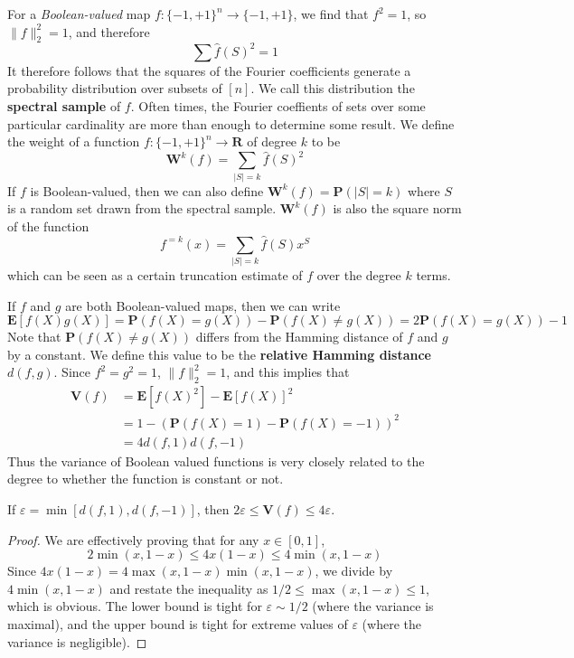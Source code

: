 For a {\it Boolean-valued} map $f: \{ -1, +1 \}^n \to \{ -1, +1 \}$, we find that $f^2 = 1$, so $\| f \|_2^2 = 1$, and therefore
%
\[ \sum \widehat{f}(S)^2 = 1 \]
%
It therefore follows that the squares of the Fourier coefficients generate a probability distribution over subsets of $[n]$. We call this distribution the {\bf spectral sample} of $f$. Often times, the Fourier coeffients of sets over some particular cardinality are more than enough to determine some result. We define the weight of a function $f: \{ -1, +1 \}^n \to \mathbf{R}$ of degree $k$ to be
%
\[ \mathbf{W}^k(f) = \sum_{|S| = k} \widehat{f}(S)^2 \]
%
If $f$ is Boolean-valued, then we can also define $\mathbf{W}^k(f) = \mathbf{P}(|S| = k)$ where $S$ is a random set drawn from the spectral sample. $\mathbf{W}^k(f)$ is also the square norm of the function
%
\[ f^{=k}(x) = \sum_{|S| = k} \widehat{f}(S) x^S \]
%
which can be seen as a certain truncation estimate of $f$ over the degree $k$ terms.

If $f$ and $g$ are both Boolean-valued maps, then we can write
%
\[ \mathbf{E}[f(X)g(X)] = \mathbf{P}(f(X) = g(X)) - \mathbf{P}(f(X) \neq g(X)) = 2\mathbf{P}(f(X) = g(X)) - 1 \]
%
Note that $\mathbf{P}(f(X) \neq g(X))$ differs from the Hamming distance of $f$ and $g$ by a constant. We define this value to be the {\bf relative Hamming distance} $d(f,g)$. Since $f^2 = g^2 = 1$, $\| f \|_2^2 = 1$, and this implies that
%
\begin{align*}
    \mathbf{V}(f) &= \mathbf{E}[f(X)^2] - \mathbf{E}[f(X)]^2\\
    &= 1 - (\mathbf{P}(f(X) = 1) - \mathbf{P}(f(X) = -1))^2\\
    &= 4d(f,1)d(f,-1)
\end{align*}
%
Thus the variance of Boolean valued functions is very closely related to the degree to whether the function is constant or not.

\begin{lemma}
    If $\varepsilon = \min[d(f,1),d(f,-1)]$, then $2\varepsilon \leq \mathbf{V}(f) \leq 4\varepsilon$.
\end{lemma}
\begin{proof}
    We are effectively proving that for any $x \in [0,1]$,
    \[ 2\min(x,1-x) \leq 4x(1-x) \leq 4\min(x,1-x) \]
    Since $4x(1-x) = 4\max(x,1-x)\min(x,1-x)$, we divide by $4\min(x,1-x)$ and restate the inequality as $1/2 \leq \max(x,1-x) \leq 1$, which is obvious. The lower bound is tight for $\varepsilon \sim 1/2$ (where the variance is maximal), and the upper bound is tight for extreme values of $\varepsilon$ (where the variance is negligible).
\end{proof}

